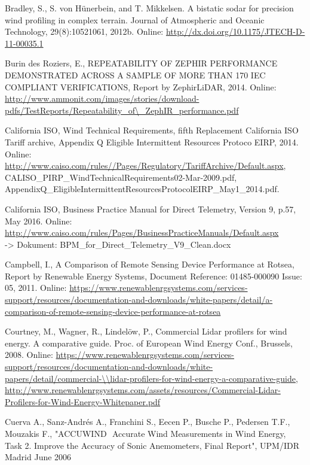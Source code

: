 Bradley, S., S. von Hünerbein, and T. Mikkelsen. A bistatic sodar for precision wind profiling in complex terrain. Journal of Atmospheric and Oceanic Technology, 29(8):1052­1061, 2012b. Online: \small{\url{http://dx.doi.org/10.1175/JTECH-D-11-00035.1}}

Burin des Roziers, E., REPEATABILITY OF ZEPHIR PERFORMANCE DEMONSTRATED ACROSS A SAMPLE OF MORE THAN 170 IEC COMPLIANT VERIFICATIONS, Report by ZephirLiDAR, 2014.  Online: \small{\url{http://www.ammonit.com/images/stories/download-pdfs/TestReports/Repeatability_of\\_ZephIR_performance.pdf}}

California ISO, Wind Technical Requirements, fifth Replacement California ISO Tariff archive, Appendix Q Eligible Intermittent Resources Protoco EIRP, 2014.   Online: \small{\url{http://www.caiso.com/rules//Pages/Regulatory/TariffArchive/Default.aspx}},\\ CALISO\_PIRP\_WindTechnicalRequirements02-Mar-2009.pdf,\\ AppendixQ\_EligibleIntermittentResourcesProtocolEIRP\_May1\_2014.pdf.


California ISO,  Business Practice Manual for Direct Telemetry, Version 9, p.57, May 2016. Online: \small{\url{http://www.caiso.com/rules/Pages/BusinessPracticeManuals/Default.aspx}}\\ -> Dokument: BPM\_for\_Direct\_Telemetry\_V9\_Clean.docx

Campbell, I., A Comparison of Remote Sensing Device Performance at Rotsea, Report by Renewable Energy Systems, Document Reference: 01485-000090 Issue: 05, 2011.
Online: \url{https://www.renewablenrgsystems.com/services-support/resources/documentation-and-downloads/white-papers/detail/a-comparison-of-remote-sensing-device-performance-at-rotsea}
	
Courtney, M., Wagner, R., Lindelöw, P., Commercial Lidar profilers for wind energy. A comparative guide. Proc. of European Wind Energy Conf., Brussels, 2008.
Online: \url{https://www.renewablenrgsystems.com/services-support/resources/documentation-and-downloads/white-papers/detail/commercial-\\lidar-profilers-for-wind-energy-a-comparative-guide},\\
\small\url{http://www.renewablenrgsystems.com/assets/resources/Commercial-Lidar-Profilers-for-Wind-Energy-Whitepaper.pdf}


Cuerva A., Sanz-Andrés A., Franchini S., Eecen P., Busche P., Pedersen T.F., Mouzakis F., "ACCUWIND ­ Accurate Wind Measurements in Wind Energy, Task 2. Improve the Accuracy of Sonic Anemometers, Final Report", UPM/IDR Madrid June 2006


